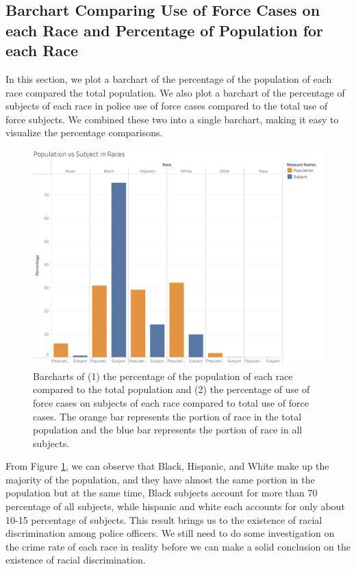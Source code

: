\documentclass[10pt]{article}
\begin{document}
\subsection{Barchart Comparing Use of Force Cases on each Race and Percentage of Population for each Race}

In this section, we plot a barchart of the percentage of the population of each race compared the total population. We also plot a barchart of the percentage of subjects of each race in police use of force cases compared to the total use of force subjects. We combined these two into a single barchart, making it easy to visualize the percentage comparisons.

\begin{figure}[h]
\centering
\includegraphics[scale=0.4]{image5.png}
\caption{Barcharts of (1) the percentage of the population of each race compared to the total population and (2) the percentage of use of force cases on subjects of each race compared to total use of force cases. The orange bar represents the portion of race in the total population and the blue bar represents the portion of race in all subjects.}
\label{fig:population}
\end{figure}


From Figure \ref{fig:population}, we can observe that Black, Hispanic, and White make up the majority of the population, and they have almost the same portion in the population but at the same time, Black subjects account for more than 70 percentage of all subjects, while hispanic and white each accounts for only about 10-15 percentage of subjects. This result brings us to the existence of racial discrimination among police officers. We still need to do some investigation on the crime rate of each race in reality before we can make a solid conclusion on the existence of racial discrimination.
\end{document}
